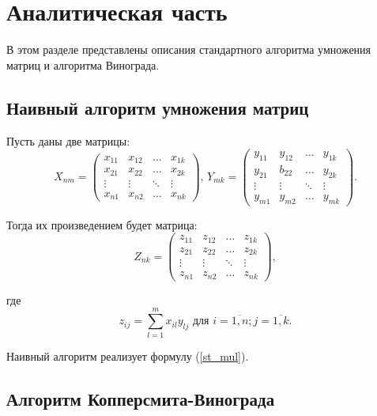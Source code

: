 \chapter{Аналитическая часть}
В этом разделе представлены описания стандартного алгоритма умножения матриц и алгоритма Винограда.
\section{Наивный алгоритм \newline умножения матриц}

Пусть даны две матрицы:
\begin{equation}
	X_{nm} = \begin{pmatrix}
		x_{11} & x_{12} & \ldots & x_{1k} \\
		x_{21} & x_{22} & \ldots & x_{2k} \\
		\vdots & \vdots & \ddots & \vdots \\
		x_{n1} & x_{n2} & \ldots & x_{nk}
	\end{pmatrix} \text{, } 
	Y_{mk} = \begin{pmatrix}
		y_{11} & y_{12} & \ldots & y_{1k} \\
		y_{21} & b_{22} & \ldots & y_{2k} \\
		\vdots & \vdots & \ddots & \vdots \\
		y_{m1} & y_{m2} & \ldots & y_{mk}
	\end{pmatrix}.
\end{equation}

Тогда их произведением будет матрица:
\begin{equation}
	Z_{nk} = \begin{pmatrix}
		z_{11} & z_{12} & \ldots & z_{1k} \\
		z_{21} & z_{22} & \ldots & z_{2k} \\
		\vdots & \vdots & \ddots & \vdots \\
		z_{n1} & z_{n2} & \ldots & z_{nk}
	\end{pmatrix},
\end{equation}

где
\begin{equation}
	\label{st_mul}
	z_{ij} = \sum_{l=1}^{m} x_{il}y_{lj} \text{ для } i=\overline{1, n}; j=\overline{1, k}.
\end{equation}

Наивный алгоритм реализует формулу (\ref{st_mul}).

\section{Алгоритм Копперсмита-Винограда}

